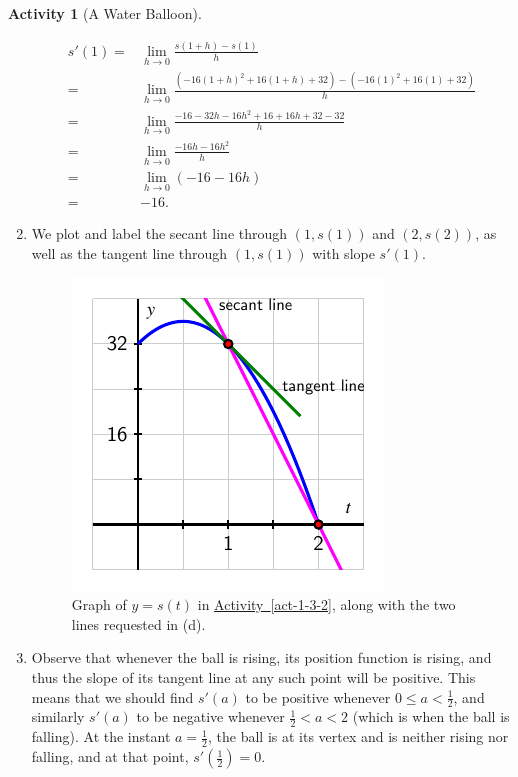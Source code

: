 \documentclass[10pt,]{book}
\theoremstyle{plain}
\theoremstyle{definition}
\theoremstyle{definition}
\theoremstyle{definition}
\theoremstyle{definition}
\newtheorem{activity}[project]{Activity}
\theoremstyle{definition}
\numberwithin{equation}{section}
\newcommand{\lt}{ < }
\newcommand{\amp}{ & }
\begin{document}
\begin{activity}[A Water Balloon]
\begin{enumerate}[label=\alph*]
            \begin{align*}
s'(1) = \amp  \lim_{h \to 0} \frac{s(1+h)-s(1)}{h}\\
   = \amp  \lim_{h \to 0} \frac{(-16(1+h)^2 + 16(1+h) + 32) - (-16(1)^2 + 16(1) + 32)}{h}\\
   = \amp  \lim_{h \to 0} \frac{-16 - 32h - 16h^2 + 16 + 16h + 32 - 32}{h}\\
   = \amp  \lim_{h \to 0} \frac{-16h - 16h^2}{h}\\
   = \amp  \lim_{h \to 0} (-16-16h)\\
   = \amp  -16.
\end{align*}%
\item\hypertarget{li-153}{}We plot and label the secant line through \((1,s(1))\) and \((2,s(2))\), as well as the tangent line through \((1,s(1))\) with slope \(s'(1)\).
              \leavevmode%
\begin{figure}
\centering
\includegraphics[width=0.5\linewidth]{images/1_3_Act2Soln}
\caption{Graph of \(y = s(t)\) in \hyperref[act-1-3-2]{Activity~\ref{act-1-3-2}}, along with the two lines requested in (d).\label{F-1-3-Act2-soln}}
\end{figure}
%
\item\hypertarget{li-154}{}Observe that whenever the ball is rising, its position function is rising, and thus the slope of its tangent line at any such point will be positive. This means that we should find \(s'(a)\) to be positive whenever \(0 \le a \lt  \frac{1}{2}\), and similarly \(s'(a)\) to be negative whenever \(\frac{1}{2} \lt  a \lt  2\) (which is when the ball is falling).  At the instant \(a = \frac{1}{2}\), the ball is at its vertex and is neither rising nor falling, and at that point, \(s'(\frac{1}{2}) = 0.\)%
\end{enumerate}
\end{activity}
\typeout{************************************************}
\typeout{************************************************}
\end{document}
